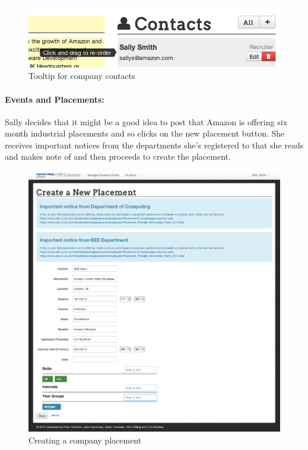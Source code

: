     \begin{figure}[H]\centering
    \includegraphics[scale=0.6]{images/user_experiences/company/contact_drag_and_drop}
    \caption{Tooltip for company contacts}
    \end{figure}

  \paragraph{Events and Placements:}
    Sally decides that it might be a good idea to post that Amazon is offering six month industrial placements and so clicks on the new placement button.
    She receives important notices from the departments she's registered to that she reads and makes note of and then proceeds to create the placement.

    \begin{figure}[H]\centering
    \includegraphics[scale=0.5]{images/user_experiences/company/new_placement}
    \caption{Creating a company placement}
    \end{figure}

